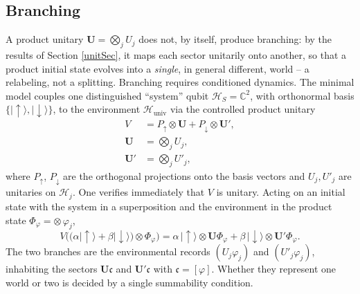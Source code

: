 \documentclass[twoside,11pt,letter]{article}
\def\bC{\mathbb{C}}
\def\ket#1{|{#1}\rangle}
\def\cH{{\mathcal{H}}}
\def\fc{{\mathfrak{c}}}
\theoremstyle{definition}
\theoremstyle{definition}
\theoremstyle{plain}
\begin{document}
\subsection{Branching}

A product unitary $\mathbf{U}=\bigotimes_j U_j$ does not, by itself, produce branching: by the results of Section \ref{unitSec}, it maps each sector unitarily onto another, so that a product initial state evolves into a \emph{single}, in general different, world -- a relabeling, not a splitting. Branching requires conditioned dynamics. The minimal model couples one distinguished ``system'' qubit $\cH_S=\bC^2$, with orthonormal basis $\{{\ket\uparrow},{\ket\downarrow}\}$, to the environment $\cH_{\mathrm{univ}}$ via the controlled product unitary
\begin{equation}\label{branchV}
\begin{split}
V&=P_\uparrow\otimes\mathbf{U}+P_\downarrow\otimes\mathbf{U}',\\
\mathbf{U}&=\bigotimes_{j}U_j,\\
\mathbf{U}'&=\bigotimes_{j}U'_j,
\end{split}
\end{equation}
where $P_\uparrow$, $P_\downarrow$ are the orthogonal projections onto the basis vectors and $U_j,U'_j$ are unitaries on $\cH_j$. One verifies immediately that $V$ is unitary. Acting on an initial state with the system in a superposition and the environment in the product state $\Phi_\varphi=\otimes\,\varphi_j$,
\begin{equation}\label{branchEq}
V\Big(\big(\alpha{\ket\uparrow}+\beta{\ket\downarrow}\big)\otimes\Phi_\varphi\Big)
=\alpha\,{\ket\uparrow}\otimes\mathbf{U}\Phi_\varphi+\beta\,{\ket\downarrow}\otimes\mathbf{U}'\Phi_\varphi.
\end{equation}
The two branches are the environmental records $(U_j\varphi_j)$ and $(U'_j\varphi_j)$, inhabiting the sectors $\mathbf{U}\fc$ and $\mathbf{U}'\fc$ with $\fc=[\varphi]$. Whether they represent one world or two is decided by a single summability condition.
\end{document}
